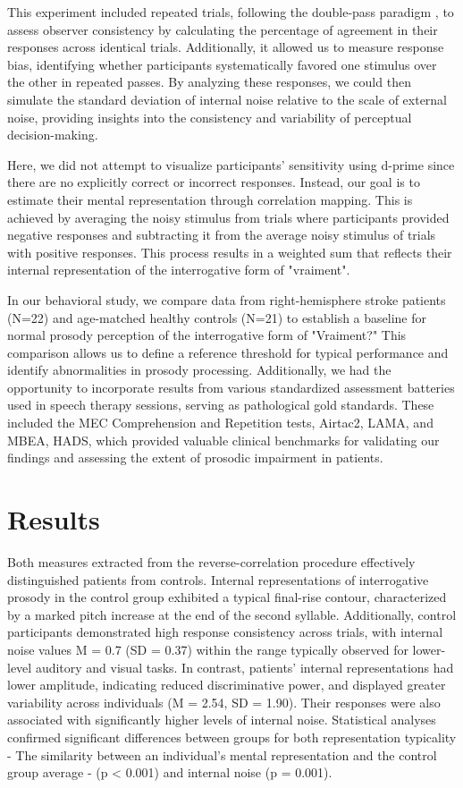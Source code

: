 This experiment included repeated trials, following the double-pass paradigm \cite{burgess_visual_1988}, to assess observer consistency by calculating the percentage of agreement in their responses across identical trials. Additionally, it allowed us to measure response bias, identifying whether participants systematically favored one stimulus over the other in repeated passes. By analyzing these responses, we could then simulate the standard deviation of internal noise relative to the scale of external noise, providing insights into the consistency and variability of perceptual decision-making. 

Here, we did not attempt to visualize participants' sensitivity using d-prime since there are no explicitly correct or incorrect responses. Instead, our goal is to estimate their mental representation through correlation mapping. This is achieved by averaging the noisy stimulus from trials where participants provided negative responses and subtracting it from the average noisy stimulus of trials with positive responses. This process results in a weighted sum that reflects their internal representation of the interrogative form of "vraiment".

In our behavioral study, we compare data from right-hemisphere stroke patients (N=22) and age-matched healthy controls (N=21) to establish a baseline for normal prosody perception of the interrogative form of "Vraiment?" This comparison allows us to define a reference threshold for typical performance and identify abnormalities in prosody processing. Additionally, we had the opportunity to incorporate results from various standardized assessment batteries used in speech therapy sessions, serving as pathological gold standards. These included the MEC Comprehension and Repetition tests, Airtac2, LAMA, and MBEA, HADS, which provided valuable clinical benchmarks for validating our findings and assessing the extent of prosodic impairment in patients.

\section{Results}
Both measures extracted from the reverse-correlation procedure effectively distinguished patients from controls. Internal representations of interrogative prosody in the control group exhibited a typical final-rise contour, characterized by a marked pitch increase at the end of the second syllable. Additionally, control participants demonstrated high response consistency across trials, with internal noise values M = 0.7 (SD = 0.37) within the range typically observed for lower-level auditory and visual tasks. In contrast, patients' internal representations had lower amplitude, indicating reduced discriminative power, and displayed greater variability across individuals (M = 2.54, SD = 1.90). Their responses were also associated with significantly higher levels of internal noise. Statistical analyses confirmed significant differences between groups for both representation typicality - The similarity between an individual's mental representation and the control group average - (p < 0.001) and internal noise (p = 0.001).

